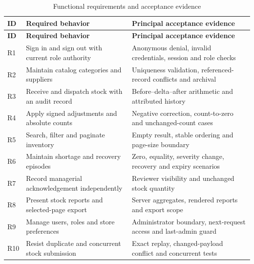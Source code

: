 \begingroup\small{}\setlength{\tabcolsep}{3pt}\renewcommand{\arraystretch}{1.25}
\begin{longtable}{>{\raggedright\arraybackslash}p{}>{\raggedright\arraybackslash}p{}>{\raggedright\arraybackslash}p{}}
\caption{Functional requirements and acceptance evidence}\label{tab:requirements}\\
\toprule
\textbf{ID} & \textbf{Required behavior} & \textbf{Principal acceptance evidence} \\
\midrule\endfirsthead
\toprule
\textbf{ID} & \textbf{Required behavior} & \textbf{Principal acceptance evidence} \\
\midrule\endhead
\bottomrule\endfoot
\leavevmode{}R1 & \leavevmode{}Sign in and sign out with current role authority & \leavevmode{}Anonymous denial, invalid credentials, session and role checks \\
\leavevmode{}R2 & \leavevmode{}Maintain catalog categories and suppliers & \leavevmode{}Uniqueness validation, referenced-record conflicts and archival \\
\leavevmode{}R3 & \leavevmode{}Receive and dispatch stock with an audit record & \leavevmode{}Before–delta–after arithmetic and attributed history \\
\leavevmode{}R4 & \leavevmode{}Apply signed adjustments and absolute counts & \leavevmode{}Negative correction, count-to-zero and unchanged-count cases \\
\leavevmode{}R5 & \leavevmode{}Search, filter and paginate inventory & \leavevmode{}Empty result, stable ordering and page-size boundary \\
\leavevmode{}R6 & \leavevmode{}Maintain shortage and recovery episodes & \leavevmode{}Zero, equality, severity change, recovery and expiry scenarios \\
\leavevmode{}R7 & \leavevmode{}Record managerial acknowledgement independently & \leavevmode{}Reviewer visibility and unchanged stock quantity \\
\leavevmode{}R8 & \leavevmode{}Present stock reports and selected-page export & \leavevmode{}Server aggregates, rendered reports and export scope \\
\leavevmode{}R9 & \leavevmode{}Manage users, roles and store preferences & \leavevmode{}Administrator boundary, next-request access and last-admin guard \\
\leavevmode{}R10 & \leavevmode{}Resist duplicate and concurrent stock submission & \leavevmode{}Exact replay, changed-payload conflict and concurrent tests \\

\end{longtable}
